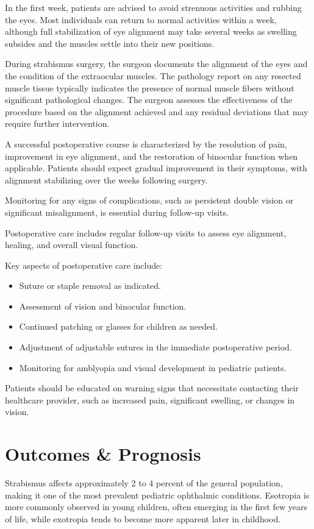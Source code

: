 In the first week, patients are advised to avoid strenuous activities and rubbing the eyes. Most individuals can return to normal activities within a week, although full stabilization of eye alignment may take several weeks as swelling subsides and the muscles settle into their new positions.

During strabismus surgery, the surgeon documents the alignment of the eyes and the condition of the extraocular muscles. The pathology report on any resected muscle tissue typically indicates the presence of normal muscle fibers without significant pathological changes. The surgeon assesses the effectiveness of the procedure based on the alignment achieved and any residual deviations that may require further intervention.

A successful postoperative course is characterized by the resolution of pain, improvement in eye alignment, and the restoration of binocular function when applicable. Patients should expect gradual improvement in their symptoms, with alignment stabilizing over the weeks following surgery. 

Monitoring for any signs of complications, such as persistent double vision or significant misalignment, is essential during follow-up visits.

Postoperative care includes regular follow-up visits to assess eye alignment, healing, and overall visual function. 

Key aspects of postoperative care include:

\begin{itemize}
  \item Suture or staple removal as indicated.
  \item Assessment of vision and binocular function.
  \item Continued patching or glasses for children as needed.
  \item Adjustment of adjustable sutures in the immediate postoperative period.
  \item Monitoring for amblyopia and visual development in pediatric patients.
\end{itemize}

Patients should be educated on warning signs that necessitate contacting their healthcare provider, such as increased pain, significant swelling, or changes in vision.

\section*{Outcomes \& Prognosis}
Strabismus affects approximately 2 to 4 percent of the general population, making it one of the most prevalent pediatric ophthalmic conditions. Esotropia is more commonly observed in young children, often emerging in the first few years of life, while exotropia tends to become more apparent later in childhood. 

